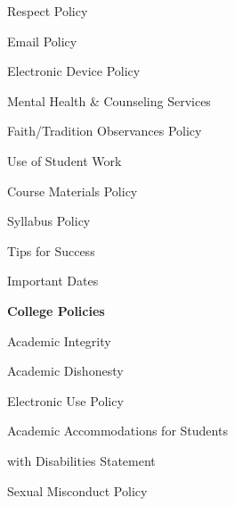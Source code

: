 \documentclass[11pt,letterpaper]{article}
\begin{document}
\begin{minipage}[t]{0.45\textwidth}
\hspace{0.3cm} Respect Policy \dotfill \pageref{respect} \par
\hspace{0.3cm} Email Policy \dotfill \pageref{email_policy}
%
\end{minipage}\hfill\begin{minipage}[t]{0.45\textwidth} \par
\hspace{0.3cm} Electronic Device Policy \dotfill \pageref{electronic} \par
\hspace{0.3cm} Mental Health \& Counseling Services \dotfill \pageref{mental_health} \par
\hspace{0.3cm} Faith/Tradition Observances Policy \dotfill \pageref{faith} \par
\hspace{0.3cm} Use of Student Work \dotfill \pageref{std_work} \par
\hspace{0.3cm} Course Materials Policy \dotfill \pageref{copyright} \par
\hspace{0.3cm} Syllabus Policy \dotfill \pageref{syllabus} \par
\hspace{0.3cm} Tips for Success \dotfill \pageref{tips} \par
\hspace{0.3cm} Important Dates \dotfill \pageref{imp_dates} \par
{\bfseries\color{stacred} College Policies} \dotfill \pageref{college_polc} \par
\hspace{0.3cm} Academic Integrity \dotfill \pageref{college_acadint} \par
\hspace{0.3cm} Academic Dishonesty \dotfill \pageref{college_acaddis} \par
\hspace{0.3cm} Electronic Use Policy \dotfill \pageref{college_elecuse} \par
\hspace{0.3cm} Academic Accommodations for Students \par
\hspace{0.6cm} with Disabilities Statement \dotfill \pageref{college_acadacc} \par
\hspace{0.3cm} Sexual Misconduct Policy \dotfill \pageref{college_sexmisconduct} \par

\end{minipage}
\end{document}
